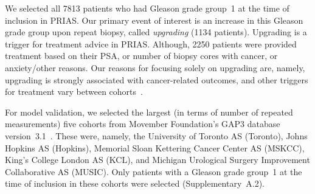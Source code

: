 We selected all 7813 patients who had Gleason grade group~1 at the time of inclusion in PRIAS. Our primary event of interest is an increase in this Gleason grade group upon repeat biopsy, called \textit{upgrading} (1134 patients). Upgrading is a trigger for treatment advice in PRIAS. Although, 2250 patients were provided treatment based on their PSA, or number of biopsy cores with cancer, or anxiety/other reasons. Our reasons for focusing solely on upgrading are, namely, upgrading is strongly associated with cancer-related outcomes, and other triggers for treatment vary between cohorts~\citep{nieboer2018active}.

For model validation, we selected the largest (in terms of number of repeated measurements) five cohorts from Movember Foundation's GAP3 database version~3.1~\citep{gap3_2018}. These were, namely, the University of Toronto AS (Toronto), Johns Hopkins AS (Hopkins), Memorial Sloan Kettering Cancer Center AS (MSKCC), King's College London AS (KCL), and Michigan Urological Surgery Improvement Collaborative AS (MUSIC). Only patients with a Gleason grade group~1 at the time of inclusion in these cohorts were selected (Supplementary~A.2).